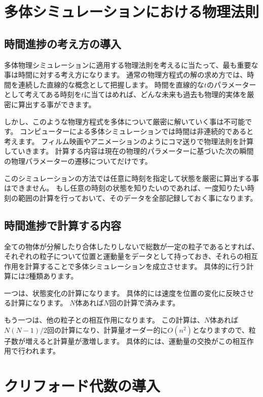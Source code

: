 \documentclass[a4paper,12pt,notitlepage]{jsreport}
\begin{document}
\chapter{多体シミュレーションにおける物理法則}

\section{時間進捗の考え方の導入}

多体物理シミュレーションに適用する物理法則を考えるに当たって、最も重要な事は時間に対する考え方になります。
通常の物理方程式の解の求め方では、時間を連続した直線的な概念として把握します。
時間を直線的な$t$のパラメーターとして考えてある時刻を$t$に当てはめれば、どんな未来も過去も物理的実体を厳密に算出する事ができます。

しかし、このような物理方程式を多体について厳密に解いていく事は不可能です。
コンピューターによる多体シミュレーションでは時間は非連続的であると考えます。
フィルム映画やアニメーションのようにコマ送りで物理法則を計算していきます。
計算する内容は現在の物理的パラメーターに基づいた次の瞬間の物理パラメーターの遷移についてだけです。

このシミュレーションの方法では任意に時刻を指定して状態を厳密に算出する事はできません。
もし任意の時刻の状態を知りたいのであれば、一度知りたい時刻の範囲の計算を行っておいて、そのデータを全部記録しておく事になります。

\section{時間進捗で計算する内容}

全ての物体が分解したり合体したりしないで総数が一定の粒子であるとすれば、
それぞれの粒子について位置と運動量をデータとして持っておき、それらの相互作用を計算することで多体シミュレーションを成立させます。
具体的に行う計算には2種類あります。

一つは、状態変化の計算になります。
具体的には速度を位置の変化に反映させる計算になります。
$N$体あれば$N$回の計算で済みます。

もう一つは、他の粒子との相互作用になります。
この計算は、$N$体あれば$N(N-1)/2$回の計算になり、計算量オーダー的に$O(n^2)$となりますので、粒子数が増えると計算量が激増します。
具体的には、運動量の交換がこの相互作用で行われます。

\chapter{クリフォード代数の導入}
\end{document}
